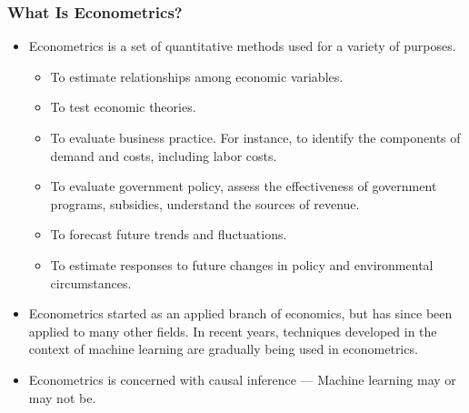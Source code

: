 

\begin{frame}
\frametitle{What Is Econometrics?}
\begin{itemize}
\item Econometrics is a set of quantitative methods used for a variety of purposes. 
\begin{itemize}
\item To estimate relationships among economic variables.
\item To test economic theories.
\item To evaluate business practice. For instance, to identify the components of demand and costs, including labor costs.
\item To evaluate government policy, assess the effectiveness of government programs, subsidies, understand the sources of revenue.
\item To forecast future trends and fluctuations.
\item To estimate responses to future changes in policy and environmental circumstances.
\end{itemize}
\item Econometrics started as an applied branch of economics, but has since been applied to many other fields. In recent years, techniques developed in the context of machine learning are gradually being used in econometrics.
\item Econometrics is concerned with causal inference --- Machine learning may or may not be.
\end{itemize}
\end{frame}


